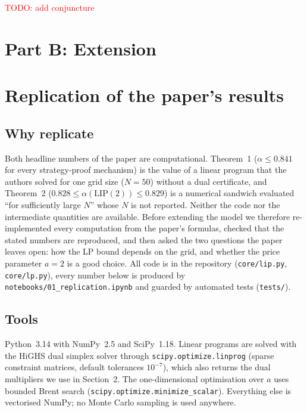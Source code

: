 \documentclass{article}
\newcommand{\red}{\textcolor{red}}
\renewcommand\todo[1]{{\red{TODO: {#1}}}}
\begin{document}
\todo{add conjuncture}

\newpage

\section*{Part B: Extension}



\section{Replication of the paper's results}

\subsection{Why replicate}

Both headline numbers of the paper are computational. Theorem~1 ($\alpha\le0.841$ for every
strategy-proof mechanism) is the value of a linear program that the authors solved for one grid
size ($N=50$) without a dual certificate, and Theorem~2 ($0.828\le\alpha(\mathrm{LIP}(2))\le0.829$)
is a numerical sandwich evaluated ``for sufficiently large $N$'' whose $N$ is not reported. Neither
the code nor the intermediate quantities are available. Before extending the model we therefore
re-implemented every computation from the paper's formulas, checked that the stated numbers are
reproduced, and then asked the two questions the paper leaves open: how the LP bound depends on
the grid, and whether the price parameter $a=2$ is a good choice. All code is in the repository
(\texttt{core/lip.py}, \texttt{core/lp.py}), every number below is produced by
\texttt{notebooks/01\_replication.ipynb} and guarded by automated tests (\texttt{tests/}).

\subsection{Tools}

Python~3.14 with NumPy~2.5 and SciPy~1.18. Linear programs are solved with the HiGHS dual
simplex solver through \texttt{scipy.optimize.linprog} (sparse constraint matrices, default
tolerances $10^{-7}$), which also returns the dual multipliers we use in Section~2. The
one-dimensional optimisation over $a$ uses bounded Brent search
(\texttt{scipy.optimize.minimize\_scalar}). Everything else is vectorised NumPy; no Monte Carlo
sampling is used anywhere.
\end{document}
